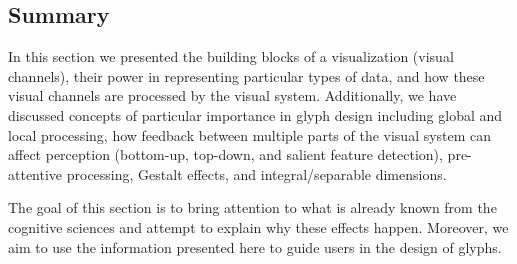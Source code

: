 \subsection{Summary}
In this section we presented the building blocks of a visualization (visual channels), their power in representing particular types of data, and how these visual channels are processed by the visual system.
Additionally, we have discussed concepts of particular importance in glyph design including global and local processing, how feedback between multiple parts of the visual system can affect perception (bottom-up, top-down, and salient feature detection), pre-attentive processing, Gestalt effects, and integral/separable dimensions.

The goal of this section is to bring attention to what is already known from the cognitive sciences and attempt to explain why these effects happen.
Moreover, we aim to use the information presented here to guide users in the design of glyphs.

